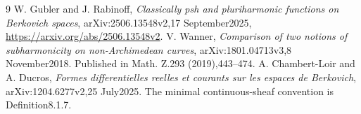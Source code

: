 \documentclass[11pt]{article}
\begin{document}
\begin{thebibliography}{9}
 W. Gubler and J. Rabinoff,
\emph{Classically psh and pluriharmonic functions on Berkovich spaces},
arXiv:2506.13548v2,17 September2025,
\url{https://arxiv.org/abs/2506.13548v2}.
 V. Wanner,
\emph{Comparison of two notions of subharmonicity on non-Archimedean
curves}, arXiv:1801.04713v3,8 November2018.
Published in Math. Z.293 (2019),443--474.
 A. Chambert-Loir and A. Ducros,
\emph{Formes differentielles reelles et courants sur les espaces de
Berkovich}, arXiv:1204.6277v2,25 July2025.
The minimal continuous-sheaf convention is Definition8.1.7.
\end{thebibliography}
\end{document}
